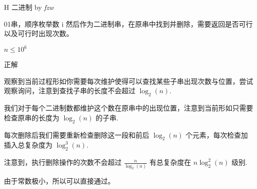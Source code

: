 \begin{frame}{H 二进制 {by \itshape fzw}}

	01串，顺序枚举数 i 然后作为二进制串，在原串中找到并删除，需要返回是否可行以及可行时出现次数。

	$n\le 10^6$

\end{frame}

\begin{frame}{正解}

	观察到当前过程形如你需要每次维护使得可以查找某些子串出现次数与位置，尝试观察询问，注意到查找子串的长度不会超过 $\log_2 (n)$. \pause

	我们对于每个二进制数都维护这个数在原串中的出现位置，注意到当前形如只需要检查原串的长度为 $\log_2(n)$ 的子串. \pause

	每次删除后我们需要重新检查删除这一段和前后 $\log_2(n)$ 个元素，每次检查加插入总复杂度为 $\log_2^3(n)$. \pause

	注意到，执行删除操作的次数不会超过 $\frac n{\log_2(n)}$ 有总复杂度在 $n\log_2^2(n)$ 级别. \pause

	由于常数极小，所以可以直接通过。

\end{frame}
